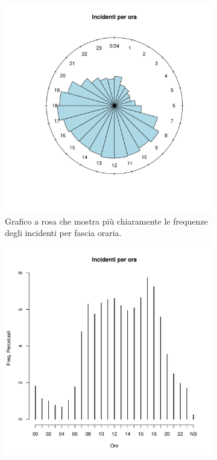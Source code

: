 \documentclass[12pt,a4paper,final,oneside]{article}			%
\begin{document}
        \begin{figure}[t]
        \centering
            \begin{subfigure}{.48\textwidth}
                \includegraphics[scale=0.35]{./../results/incidenti_per_ora_orologio.pdf}
                \caption{Grafico a rosa che mostra più chiaramente le frequenze degli incidenti per fascia oraria.}
                \label{Fig: incidenti_per_ora_orologio}
            \end{subfigure}
            \hfill
            \begin{subfigure}{.48\textwidth}
                \includegraphics[scale=0.35]{./../results/incidenti_per_ora.pdf}

\end{subfigure}
\end{figure}
\end{document}
